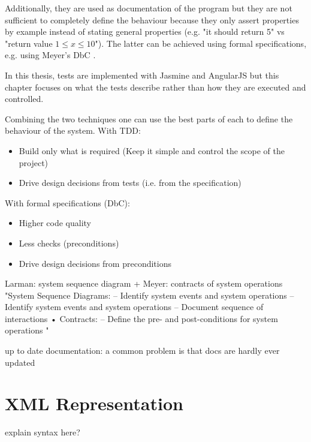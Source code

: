 Additionally, they are used as documentation of the program but they are not sufficient to completely define the behaviour because they only assert properties by example instead of stating general properties (e.g. "it should return 5" vs "return value $1 \leq x \leq 10$"). The latter can be achieved using formal specifications,
e.g. using Meyer's \ac{DbC} \cite{Baumeister:2004}.

In this thesis, tests are implemented with Jasmine and AngularJS but this chapter focuses on what the tests describe rather than how they are executed and controlled.

Combining the two techniques one can use the best parts of each to define the behaviour of the system.
With \ac{TDD}:
\begin{itemize}
    \item Build only what is required (Keep it simple and control the scope of the project)
    \item Drive design decisions from tests (i.e. from the specification)
\end{itemize}

With formal specifications (\ac{DbC}):
\begin{itemize}
    \item Higher code quality
    \item Less checks (preconditions)
    \item Drive design decisions from preconditions
\end{itemize}


Larman: system sequence diagram + Meyer: contracts of system operations
"System Sequence Diagrams:
–
Identify system events and system operations
–
Identify system events and system operations
– Document sequence of interactions
• Contracts:
– Define the pre- and post-conditions for system
operations "

up to date documentation: a common problem is that docs are hardly ever updated

\section{XML Representation}
explain syntax here?